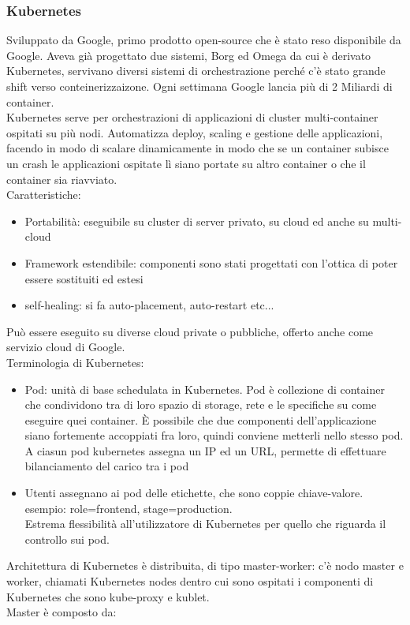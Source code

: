 \documentclass{article}
\begin{document}
\subsubsection{Kubernetes}
Sviluppato da Google, primo prodotto open-source che è stato reso disponibile da Google. Aveva già progettato due sistemi, Borg ed Omega da cui è derivato Kubernetes, servivano diversi sistemi di orchestrazione perché c'è stato grande shift verso conteinerizzaizone. Ogni settimana Google lancia più di 2 Miliardi di container.\\ Kubernetes serve per orchestrazioni di applicazioni di cluster multi-container ospitati su più nodi. Automatizza deploy, scaling e gestione delle applicazioni, facendo in modo di scalare dinamicamente in modo che se un container subisce un crash le applicazioni ospitate lì siano portate su altro container o che il container sia riavviato.\\ Caratteristiche:
\begin{itemize}
\item Portabilità: eseguibile su cluster di server privato, su cloud ed anche su multi-cloud
\item Framework estendibile: componenti sono stati progettati con l'ottica di poter essere sostituiti ed estesi
\item self-healing: si fa auto-placement, auto-restart etc...
\end{itemize}
Può essere eseguito su diverse cloud private o pubbliche, offerto anche come servizio cloud di Google.\\ Terminologia di Kubernetes:
\begin{itemize}
\item Pod: unità di base schedulata in Kubernetes. Pod è collezione di container che condividono tra di loro spazio di storage, rete e le specifiche su come eseguire quei container. È possibile che due componenti dell'applicazione siano fortemente accoppiati fra loro, quindi conviene metterli nello stesso pod.\\ A ciasun pod kubernetes assegna un IP ed un URL, permette di effettuare bilanciamento del carico tra i pod
\item Utenti assegnano ai pod delle etichette, che sono coppie chiave-valore. esempio: role=frontend, stage=production.\\ Estrema flessibilità all'utilizzatore di Kubernetes per quello che riguarda il controllo sui pod.
\end{itemize}
Architettura di Kubernetes è distribuita, di tipo master-worker: c'è nodo master e worker, chiamati Kubernetes nodes dentro cui sono ospitati i componenti di Kubernetes che sono kube-proxy e kublet.\\ Master è composto da:
\end{document}
